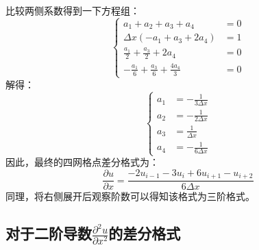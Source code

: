 \documentclass[UTF8]{ctexart}
\begin{document}
比较两侧系数得到一下方程组：
\begin{equation}
    \begin{cases}
        a_1 + a_2 + a_3 + a_4 &= 0 \\
        \Delta x(-a_1 + a_3 + 2a_4) &= 1 \\
        \frac{a_1}{2} + \frac{a_3}{2} + 2a_4 &= 0 \\
        -\frac{a_1}{6} + \frac{a_3}{6} + \frac{4a_4}{3} &= 0
    \end{cases}
\end{equation}
解得：
\begin{equation}
    \begin{cases}
        a_1 &=  -\frac{1}{3\Delta x}\\
        a_2 &=  -\frac{1}{2\Delta x}\\
        a_3 &=  \frac{1}{\Delta x}\\
        a_4 &=  -\frac{1}{6\Delta x}
    \end{cases}
\end{equation}
因此，最终的四网格点差分格式为：
\begin{equation}
    \frac{\partial u}{\partial x} = \frac{-2u_{i-1}-3u_i + 6u_{i+1} - u_{i+2}}{6\Delta x} 
\end{equation}
同理，将右侧展开后观察阶数可以得知该格式为三阶格式。

\subsection{对于二阶导数$\frac{\partial^2 u}{\partial x^2}$的差分格式}
\end{document}

